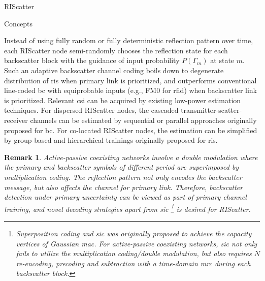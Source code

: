 \documentclass[journal]{IEEEtran}
\newtheorem{remark}{Remark}
\begin{document}
\begin{section}{RIScatter}
\begin{subsection}{Concepts}
\begin{figure}[!t]
		\end{figure}
		Instead of using fully random or fully deterministic reflection pattern over time, each RIScatter node semi-randomly chooses the reflection state for each backscatter block with the guidance of input probability $P(\Gamma_m)$ at state $m$.
		Such an adaptive backscatter channel coding boils down to degenerate distribution of \gls{ris} when primary link is prioritized, and outperforms conventional line-coded \gls{bc} with equiprobable inputs (e.g., FM0 for \gls{rfid}) when backscatter link is prioritized.
		Relevant \gls{csi} can be acquired by existing low-power estimation techniques.
		For dispersed RIScatter nodes, the cascaded transmitter-scatter-receiver channels can be estimated by sequential \cite{Bharadia2015,Yang2015b,Guo2019g} or parallel approaches \cite{Jin2021a} originally proposed for \gls{bc}.
		For co-located RIScatter nodes, the estimation can be simplified by group-based \cite{Zheng2019} and hierarchical \cite{You2019} trainings originally proposed for \gls{ris}.

		\begin{remark}
			Active-passive coexisting networks involve a double modulation where the primary and backscatter symbols of different period are superimposed by multiplication coding.
			The reflection pattern not only encodes the backscatter message, but also affects the channel for primary link.
			Therefore, backscatter detection under primary uncertainty can be viewed as part of primary channel training, and novel decoding strategies apart from \gls{sic}%
			\footnote{
				Superposition coding and \gls{sic} was originally proposed to achieve the capacity vertices of Gaussian \gls{mac}.
				For active-passive coexisting networks, \gls{sic} not only fails to utilize the multiplication coding/double modulation, but also requires $N$ re-encoding, precoding and subtraction with a time-domain \gls{mrc} during each backscatter block.
			}
			is desired for RIScatter.
		\end{remark}


\end{subsection}
\end{section}
\end{document}
